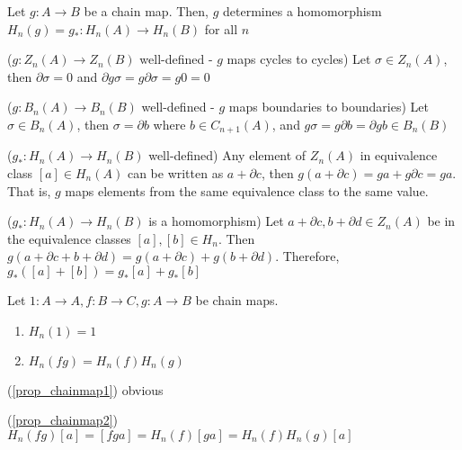 \documentclass{report}
\begin{document}
\begin{proposition}
    Let $g: A \to B$ be a chain map. Then, $g$ determines a homomorphism $H_n(g) = g_*: H_n(A) \to H_n(B)$ for all $n$
    \begin{center}
    \end{center}
\end{proposition}

\begin{longproof}
    ($g: Z_n(A) \to Z_n(B)$ well-defined - $g$ maps cycles to cycles) Let $\sigma \in Z_n(A)$, then $\partial \sigma = 0$ and $\partial g \sigma = g \partial \sigma = g 0 = 0$

    ($g: B_n(A) \to B_n(B)$ well-defined - $g$ maps boundaries to boundaries) Let $\sigma \in B_n(A)$, then $\sigma = \partial b$ where $b \in C_{n+1}(A)$, and $g \sigma = g \partial b = \partial g b \in B_n(B)$
    
    ($g_*: H_n(A) \to H_n(B)$ well-defined) Any element of $Z_n(A)$ in equivalence class $[a] \in H_n(A)$ can be written as $a + \partial c$, then $g(a + \partial c) = ga + g \partial c = ga$. That is, $g$ maps elements from the same equivalence class to the same value.

    ($g_*: H_n(A) \to H_n(B)$ is a homomorphism) Let $a + \partial c, b + \partial d \in Z_n(A)$ be in the equivalence classes $[a], [b] \in H_n$. Then $g(a + \partial c + b + \partial d) = g(a + \partial c) + g(b + \partial d)$. Therefore, $g_*([a] + [b]) = g_*[a] + g_*[b]$
\end{longproof}

\begin{proposition}
    Let $1: A \to A, f: B \to C, g: A \to B$ be chain maps.
    \begin{enumerate}
        \item $H_n(1) = 1$ \label{prop_chainmap1}
        \item $H_n(fg) = H_n(f) H_n(g)$ \label{prop_chainmap2}
    \end{enumerate}
\end{proposition}

\begin{longproof}
    (\ref{prop_chainmap1}) obvious
    
    (\ref{prop_chainmap2}) $H_n(f g)[a] = [fga] = H_n(f)[ga] = H_n(f) H_n(g)[a]$
\end{longproof}
\end{document}
